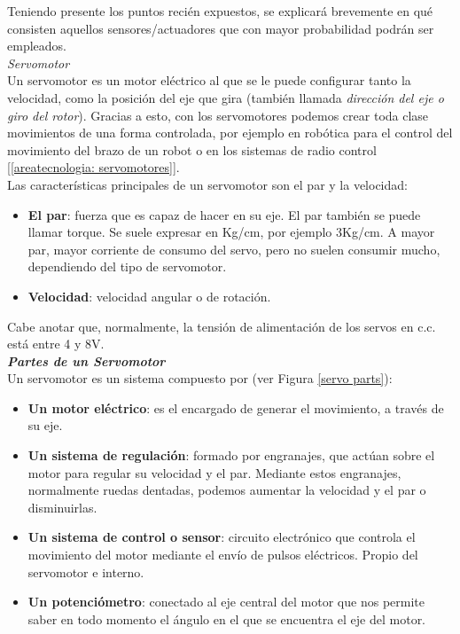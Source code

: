 \documentclass[12pt]{article}
\begin{document}
	\noindent Teniendo presente los puntos recién expuestos, se explicará brevemente en qué consisten aquellos sensores/actuadores que con mayor probabilidad podrán ser empleados. \\
	
	\noindent \textit{Servomotor} \\
	
	\noindent Un servomotor es un motor eléctrico al que se le puede configurar tanto la velocidad, como la posición del eje que gira (también llamada \textit{dirección del eje o giro del rotor}). Gracias a esto, con los servomotores podemos crear toda clase movimientos de una forma controlada, por ejemplo en robótica para el control del movimiento del brazo de un robot o en los sistemas de radio control [\ref{areatecnologia: servomotores}]. \\
	
	\noindent Las características principales de un servomotor son el par y la velocidad:
	
	\begin{itemize}
		\item \textbf{El par}: fuerza que es capaz de hacer en su eje. El par también se puede llamar torque. Se suele expresar en Kg/cm, por ejemplo 3Kg/cm. A mayor par, mayor corriente de consumo del servo, pero no suelen consumir mucho, dependiendo del tipo de servomotor.
		\item \textbf{Velocidad}: velocidad angular o de rotación.
	\end{itemize}

	\noindent Cabe anotar que, normalmente, la tensión de alimentación de los servos en c.c. está entre 4 y 8V.\\ 
	
	\noindent \textit{\textbf{Partes de un Servomotor}}\\
	
	\noindent Un servomotor es un sistema compuesto por (ver Figura \ref{servo parts}): 
	
	\begin{itemize}
		\item \textbf{Un motor eléctrico}: es el encargado de generar el movimiento, a través de su eje.
		\item \textbf{Un sistema de regulación}: formado por engranajes, que actúan sobre el motor para regular su velocidad y el par. Mediante estos engranajes, normalmente ruedas dentadas, podemos aumentar la velocidad y el par o disminuirlas.
		\item \textbf{Un sistema de control o sensor}: circuito electrónico que controla el movimiento del motor mediante el envío de pulsos eléctricos. Propio del servomotor e interno.
		\item \textbf{Un potenciómetro}: conectado al eje central del motor que nos permite saber en todo momento el ángulo en el que se encuentra el eje del motor. %
	\end{itemize}
	
\end{document}
